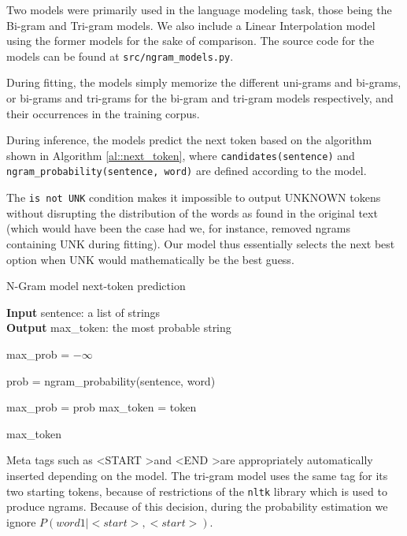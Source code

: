 \documentclass[11pt, a4paper]{article}
\begin{document}
	Two models were primarily used in the language modeling task, those being the Bi-gram and Tri-gram models. We also include a Linear Interpolation model using the former models for the sake of comparison. The source code for the models can be found at \texttt{src/ngram\_models.py}.
	
	During fitting, the models simply memorize the different uni-grams and bi-grams, or bi-grams and tri-grams for the bi-gram and tri-gram models respectively, and their occurrences in the training corpus. 
	
	During inference, the models predict the next token based on the algorithm shown in Algorithm \ref{al::next_token}, where \texttt{candidates(sentence)} and \texttt{ngram\_probability(sentence, word)} are defined according to the model. 
	
	The \texttt{is not UNK} condition makes it impossible to output UNKNOWN tokens without disrupting the distribution of the words as found in the original text (which would have been the case had we, for instance, removed ngrams containing UNK during fitting). Our model thus essentially selects the next best option when UNK would mathematically be the best guess.
	
	\begin{algorithm}
		\caption{N-Gram model next-token prediction} 
		\label{al::next_token}
		
		\hspace*{\algorithmicindent} \textbf{Input} sentence: a list of strings\\
		\hspace*{\algorithmicindent} \textbf{Output} max\_token: the most probable string
		\begin{algorithmic}[1]
			
			\State max\_prob = $-\infty$
			
			
					\State prob = ngram\_probability(sentence, word)
					
						\State max\_prob = prob
						\State max\_token = token
					\EndIf
				
				\EndIf
			
			\EndFor
			
			\State \Return max\_token
		\end{algorithmic} 
	\end{algorithm}
	
	
	Meta tags such as \textless START \textgreater  and \textless END \textgreater  are appropriately automatically inserted depending on the model. The tri-gram model uses the same tag for its two starting tokens, because of restrictions of the \texttt{nltk} library which is used to produce ngrams. Because of this decision, during the probability estimation we ignore $P(word1 | <start>, <start> )$.
	
\end{document}
